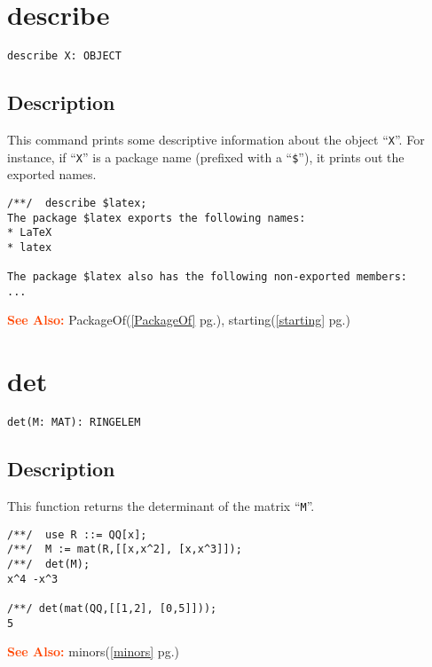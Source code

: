 \documentclass[a4paper]{mybook}
\newenvironment{command}{}{} %
\newcommand\SeeAlso{\par\textcolor{OrangeRed}{\textbf{\large See Also: }}}
\begin{document}
\section{describe}
\label{describe}
\begin{command} %


\begin{Verbatim}[label=syntax, rulecolor=\color{MidnightBlue},
frame=single]
describe X: OBJECT
\end{Verbatim}


\subsection*{Description}

This command prints some descriptive information about the object ``\verb&X&''.  For
instance, if ``\verb&X&'' is a package name (prefixed with a ``\verb&$&''), it prints out the exported names.
\begin{Verbatim}[label=example, rulecolor=\color{PineGreen}, frame=single]
/**/  describe $latex;
The package $latex exports the following names:
* LaTeX
* latex

The package $latex also has the following non-exported members:
... 
\end{Verbatim}


\SeeAlso %
  PackageOf(\ref{PackageOf} pg.\pageref{PackageOf}), 
    starting(\ref{starting} pg.\pageref{starting})
\end{command} %

\section{det}
\label{det}
\begin{command} %


\begin{Verbatim}[label=syntax, rulecolor=\color{MidnightBlue},
frame=single]
det(M: MAT): RINGELEM
\end{Verbatim}


\subsection*{Description}

This function returns the determinant of the matrix ``\verb&M&''.
\begin{Verbatim}[label=example, rulecolor=\color{PineGreen}, frame=single]
/**/  use R ::= QQ[x];
/**/  M := mat(R,[[x,x^2], [x,x^3]]);
/**/  det(M);
x^4 -x^3

/**/ det(mat(QQ,[[1,2], [0,5]]));
5
\end{Verbatim}


\SeeAlso %
  minors(\ref{minors} pg.\pageref{minors})
\end{command} %
\end{document}
